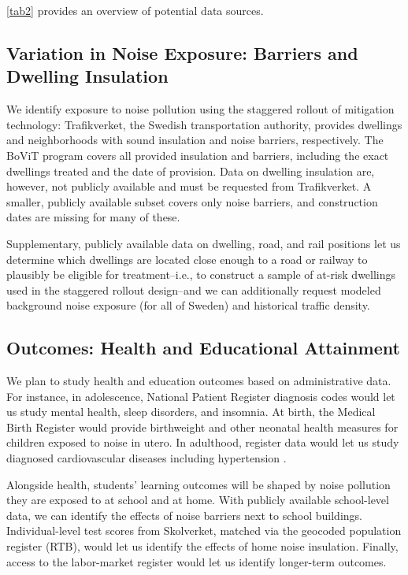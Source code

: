\documentclass[11pt]{article}
\begin{document}
\autoref{tab2} provides an overview of potential data sources.

\subsection*{Variation in Noise Exposure: Barriers and Dwelling Insulation}

We identify exposure to noise pollution using the staggered rollout of mitigation technology: Trafikverket, the Swedish transportation authority, provides dwellings and neighborhoods with sound insulation and noise barriers, respectively. The BoViT program covers all provided insulation and barriers, including the exact dwellings treated and the date of provision. Data on dwelling insulation are, however, not publicly available and must be requested from Trafikverket. A smaller, publicly available subset covers only noise barriers, and construction dates are missing for many of these. 

Supplementary, publicly available data on dwelling, road, and rail positions let us determine which dwellings are located close enough to a road or railway to plausibly be eligible for treatment--i.e., to construct a sample of at-risk dwellings used in the staggered rollout design--and we can additionally request modeled background noise exposure (for all of Sweden) and historical traffic density.

\subsection*{Outcomes: Health and Educational Attainment}

We plan to study health and education outcomes based on administrative data. For instance, in adolescence, National Patient Register diagnosis codes would let us study mental health, sleep disorders, and insomnia. At birth, the Medical Birth Register would provide birthweight and other neonatal health measures for children exposed to noise in utero. In adulthood, register data would let us study diagnosed cardiovascular diseases including hypertension \parencite[similar to][]{lindgrenSoundEnvironmentHealth2021}.

Alongside health, students' learning outcomes will be shaped by noise pollution they are exposed to at school and at home. With publicly available school-level data, we can identify the effects of noise barriers next to school buildings. Individual-level test scores from Skolverket, matched via the geocoded population register (RTB), would let us identify the effects of home noise insulation. Finally, access to the labor-market register would let us identify longer-term outcomes.
\end{document}
